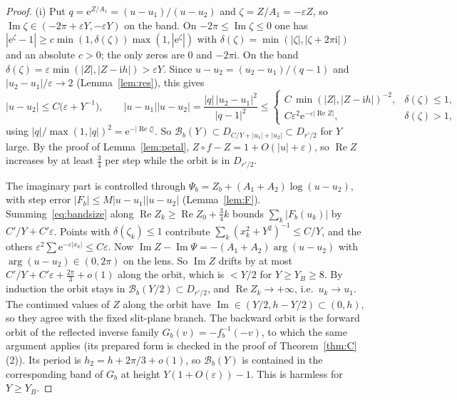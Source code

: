\documentclass[11pt,a4paper]{article}
\theoremstyle{definition}
\newcommand{\eee}{\mathrm{e}}
\newcommand{\ii}{\mathrm{i}}
\begin{document}
\begin{proof}
(i) Put $q=\eee^{Z/A_1}=(u-u_1)/(u-u_2)$ and $\zeta=Z/A_1=-\varepsilon Z$, so
$\operatorname{Im}\zeta\in(-2\pi+\varepsilon Y,-\varepsilon Y)$ on the band.  On
$-2\pi\le\operatorname{Im}\zeta\le0$ one has
$|\eee^\zeta-1|\ge c\min(1,\delta(\zeta))\max(1,|\eee^\zeta|)$ with
$\delta(\zeta)=\min(|\zeta|,|\zeta+2\pi\ii|)$ and an absolute $c>0$; the only
zeros are $0$ and $-2\pi\ii$.  On the band
$\delta(\zeta)=\varepsilon\min(|Z|,|Z-\ii h|)>\varepsilon Y$.  Since
$u-u_2=(u_2-u_1)/(q-1)$ and $|u_2-u_1|/\varepsilon\to2$
(Lemma~\ref{lem:res}), this gives
\begin{equation}\label{eq:bandsize}
 |u-u_2|\le C\bigl(\varepsilon+Y^{-1}\bigr),\qquad
 |u-u_1||u-u_2|=\frac{|q|\,|u_2-u_1|^2}{|q-1|^2}\le
 \begin{cases}C\,\min(|Z|,|Z-\ii h|)^{-2},&\delta(\zeta)\le1,\\
 C\varepsilon^2\eee^{-\varepsilon|\operatorname{Re}Z|},&\delta(\zeta)>1,\end{cases}
\end{equation}
using $|q|/\max(1,|q|)^2=\eee^{-|\operatorname{Re}\zeta|}$.  So
$\mathcal B_b(Y)\subset D_{C/Y+|u_1|+|u_2|}\subset D_{r'/2}$ for $Y$ large.  By the
proof of Lemma~\ref{lem:petal}, $Z\circ f-Z=1+O(|u|+\varepsilon)$, so
$\operatorname{Re}Z$ increases by at least $\tfrac34$ per step while the orbit is
in $D_{r'/2}$.

The imaginary part is controlled through
$\Psi_b=Z_b+(A_1+A_2)\log(u-u_2)$, with step error
$|F_b|\le M|u-u_1||u-u_2|$ (Lemma~\ref{lem:F}).  Summing~\eqref{eq:bandsize}
along $\operatorname{Re}Z_k\ge\operatorname{Re}Z_0+\tfrac34k$ bounds
$\sum_k|F_b(u_k)|$ by $C'/Y+C'\varepsilon$.  Points with
$\delta(\zeta_k)\le1$ contribute $\sum_k(x_k^2+Y^2)^{-1}\le C/Y$, and the others
$\varepsilon^2\sum\eee^{-\varepsilon|x_k|}\le C\varepsilon$.  Now
$\operatorname{Im}Z-\operatorname{Im}\Psi=-(A_1+A_2)\arg(u-u_2)$ with
$\arg(u-u_2)\in(0,2\pi)$ on the lens.  So $\operatorname{Im}Z$ drifts by at most
$C'/Y+C'\varepsilon+\tfrac{2\pi}3+o(1)$ along the orbit, which is $<Y/2$ for
$Y\ge Y_B\ge8$.  By induction the orbit stays in
$\mathcal B_b(Y/2)\subset D_{r'/2}$, and $\operatorname{Re}Z_k\to+\infty$,
i.e.\ $u_k\to u_1$.  The continued values of $Z$ along the orbit have
$\operatorname{Im}\in(Y/2,h-Y/2)\subset(0,h)$, so they agree with the fixed
slit-plane branch.  The backward orbit is the forward orbit of the reflected
inverse family $G_b(v)=-f_b^{-1}(-v)$, to which the same argument applies
(its prepared form is checked in the proof of Theorem~\ref{thm:C}(2)).  Its
period is $h_2=h+2\pi/3+o(1)$, so $\mathcal B_b(Y)$ is contained in the
corresponding band of $G_b$ at height $Y(1+O(\varepsilon))-1$.  This is harmless
for $Y\ge Y_B$.


\end{proof}
\end{document}
